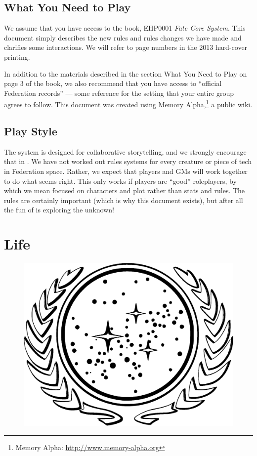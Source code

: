\documentclass[12pt,titlepage,openany]{book}
\begin{document}
\section{What You Need to Play}

We assume that you have access to the \FateCore{} book, EHP0001 \textit{Fate
Core System}. This document simply describes the new rules and rules changes we
have made and clarifies some interactions. We will refer to page numbers in the
2013 hard-cover printing.

In addition to the materials described in the section What You Need to Play on
page 3 of the \FateCore{} book, we also recommend that you have access to
``official Federation records'' --- some reference for the \StarTrek{} setting
that your entire group agrees to follow. This document was created using Memory
Alpha,\footnote{Memory Alpha: \url{http://www.memory-alpha.org}} a public
\StarTrek{} wiki.

\section{Play Style}

The \FateCore{} system is designed for collaborative storytelling, and we
strongly encourage that in \StarTrekFate{}. We have not worked out rules
systems for every creature or piece of tech in Federation space. Rather, we
expect that players and GMs will work together to do what seems right. This
only works if players are ``good'' roleplayers, by which we mean focused on
characters and plot rather than stats and rules. The rules are certainly
important (which is why this document exists), but after all the fun of
\StarTrek{} is exploring the unknown!



\chapter{\StarTrek{} Life}\label{chap:life}

\begin{figure}[H]
    \centering
    \includegraphics[width=0.5\linewidth]{img/Federation.eps}
\end{figure}
\end{document}
